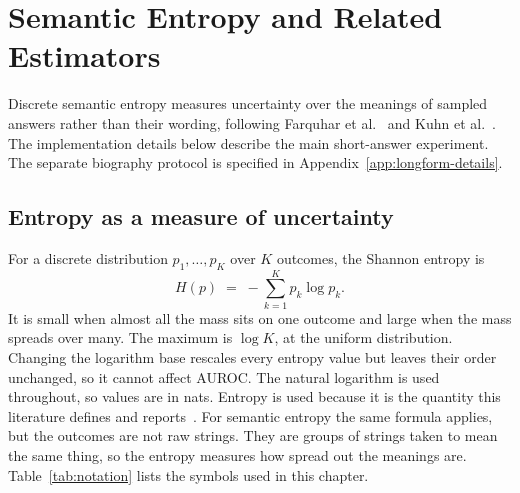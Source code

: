 \chapter{Semantic Entropy and Related Estimators}
\label{ch:semantic_entropy}

Discrete semantic entropy measures uncertainty over the meanings of sampled
answers rather than their wording, following
Farquhar et al.~\cite{semantic_entropy_nature_2024} and
Kuhn et al.~\cite{kuhn_semantic_uncertainty_2023}. The implementation details below describe the main short-answer experiment.
The separate biography protocol is specified in
Appendix~\ref{app:longform-details}.

\section{Entropy as a measure of uncertainty}
\label{sec:entropy-measure}

For a discrete distribution $p_1,\ldots,p_K$ over $K$ outcomes, the Shannon
entropy is
\[
  H(p) \;=\; -\sum_{k=1}^{K} p_k \log p_k .
\]
It is small when almost all the mass sits on one outcome and large when the
mass spreads over many. The maximum is $\log K$, at the uniform distribution.
Changing the logarithm base rescales every entropy value but leaves their order
unchanged, so it cannot affect AUROC. The natural logarithm is used throughout,
so values are in nats.
Entropy is used because it is the quantity this literature defines and
reports~\cite{kuhn_semantic_uncertainty_2023,semantic_entropy_nature_2024}.
For semantic entropy the same formula applies, but the outcomes are not raw
strings. They are groups of strings taken to mean the same thing, so the
entropy measures how spread out the meanings are. Table~\ref{tab:notation} lists the
symbols used in this chapter.

